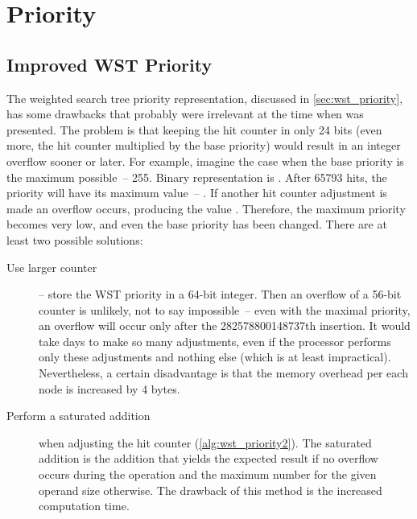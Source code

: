 \section{Priority}

\subsection{Improved WST Priority}
\label{sssec:improved_wst}
The weighted search tree priority representation, discussed in \cref{sec:wst_priority}, has some drawbacks that probably were irrelevant at the time when \cite{park90} was presented. The problem is that keeping the hit counter in only 24 bits (even more, the hit counter multiplied by the base priority) would result in an integer overflow sooner or later. For example, imagine the case when the base priority is the maximum possible~-- 255. Binary representation is . After 65793 hits, the priority will have its maximum value~-- . If another hit counter adjustment is made an overflow occurs, producing the value . Therefore, the maximum priority becomes very low, and even the base priority has been changed. There are at least two possible solutions:
\begin{description}
\item[Use larger counter]-- store the WST priority in a 64-bit integer. Then an overflow of a 56-bit counter is unlikely, not to say impossible~-- even with the maximal priority, an overflow will occur only after the 282578800148737th insertion. It would take days to make so many adjustments, even if the processor performs only these adjustments and nothing else (which is at least impractical). Nevertheless, a certain disadvantage is that the memory overhead per each node is increased by 4 bytes.
\item[Perform a saturated addition] when adjusting the hit counter (\cref{alg:wst_priority2}). The saturated addition is the addition that yields the expected result if no overflow occurs during the operation and the maximum number for the given operand size otherwise. The drawback of this method is the increased computation time.
\end{description}

